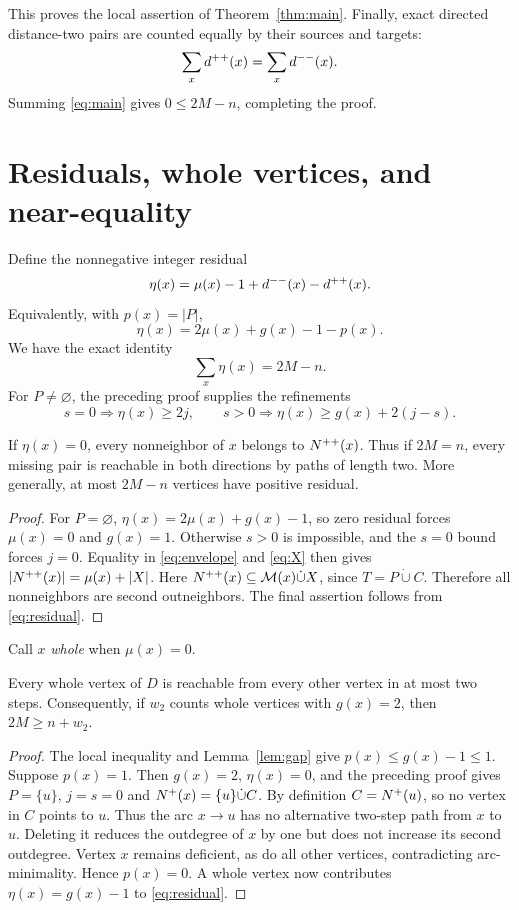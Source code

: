 This proves the local assertion of Theorem~\ref{thm:main}.
Finally, exact directed distance-two pairs are counted equally by
their sources and targets:
\[
\sum_xd^{++}(x)=\sum_xd^{--}(x).
\]
Summing \eqref{eq:main} gives $0\le2M-n$, completing the proof.


\section{Residuals, whole vertices, and near-equality}\label{sec:structure}

Define the nonnegative integer residual
\[
\eta(x)=\mu(x)-1+d^{--}(x)-d^{++}(x).
\]
Equivalently, with $p(x)=|P|$,
\[
\eta(x)=2\mu(x)+g(x)-1-p(x).
\]
We have the exact identity
\begin{equation}\label{eq:residual}
{\sum_x\eta(x)=2M-n.}
\end{equation}
For $P\ne\varnothing$, the preceding proof supplies the refinements
\[
s=0\Longrightarrow\eta(x)\ge2j,\qquad
s>0\Longrightarrow\eta(x)\ge g(x)+2(j-s).
\]

\begin{proposition}\label{prop:equality}
If $\eta(x)=0$, every nonneighbor of $x$ belongs to $N^{++}(x)$.
Thus if $2M=n$, every missing pair is reachable in both directions by
paths of length two. More generally, at most $2M-n$ vertices have
positive residual.
\end{proposition}
\begin{proof}
For $P=\varnothing$, $\eta(x)=2\mu(x)+g(x)-1$, so zero residual forces
$\mu(x)=0$ and $g(x)=1$. Otherwise $s>0$ is impossible, and the
$s=0$ bound forces $j=0$.
Equality in \eqref{eq:envelope} and \eqref{eq:X} then gives
$|N^{++}(x)|=\mu(x)+|X|$.
Here $N^{++}(x)\subseteq\mathcal M(x)\dot\cup X$, since
$T=P\dot\cup C$. Therefore all nonneighbors are second outneighbors.
The final assertion follows from \eqref{eq:residual}.
\end{proof}

Call $x$ \emph{whole} when $\mu(x)=0$.

\begin{proposition}\label{prop:whole}
Every whole vertex of $D$ is reachable from every other vertex in at
most two steps. Consequently, if $w_2$ counts whole vertices with
$g(x)=2$, then $2M\ge n+w_2$.
\end{proposition}
\begin{proof}
The local inequality and Lemma~\ref{lem:gap} give
$p(x)\le g(x)-1\le1$.
Suppose $p(x)=1$. Then $g(x)=2$, $\eta(x)=0$, and the preceding proof
gives $P=\{u\}$, $j=s=0$ and
$N^+(x)=\{u\}\dot\cup C$.
By definition $C=N^+(u)$, so no vertex in $C$ points to $u$.
Thus the arc $x\to u$ has no alternative two-step path from $x$ to $u$.
Deleting it reduces the outdegree of $x$ by one but does not increase
its second outdegree. Vertex $x$ remains deficient, as do all other
vertices, contradicting arc-minimality.
Hence $p(x)=0$. A whole vertex now contributes $\eta(x)=g(x)-1$ to
\eqref{eq:residual}.
\end{proof}


